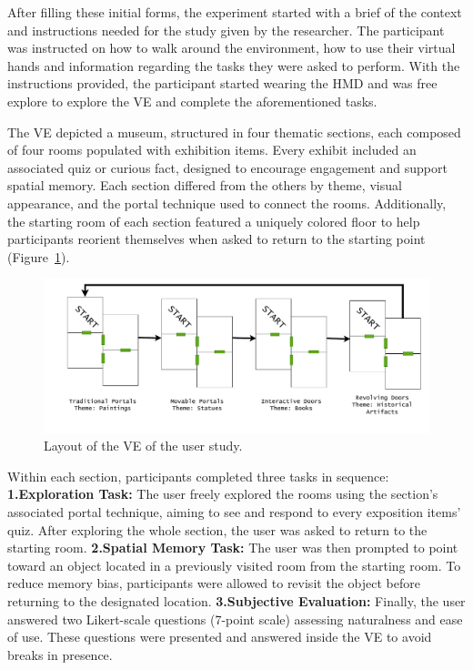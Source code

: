 After filling these initial forms, the experiment started with a brief of the context and instructions needed for the study given by the 
researcher. The participant was instructed on how to walk around the environment, how to use their virtual hands and 
information regarding the tasks they were asked to perform.  With the instructions provided, the participant started wearing the 
\gls{HMD} and was free explore to explore the \gls{VE} and complete the aforementioned tasks.

The \gls{VE} depicted a museum, structured in four thematic sections, each composed of four rooms populated with exhibition items. Every 
exhibit included an associated quiz or curious fact, designed to encourage engagement and support spatial memory. Each section differed 
from the others by theme, visual appearance, and the portal technique used to connect the rooms. Additionally, the starting room of each 
section featured a uniquely colored floor to help participants reorient themselves when asked to return to the starting point 
(Figure~\ref{fig:layout}).

\begin{figure}[t]
\centering
\includegraphics[width=\linewidth]{NOVAthesisFiles/Images/schemes/layout-study.drawio.pdf}
\caption{Layout of the \gls{VE} of the user study.}
\label{fig:layout}
\end{figure}

Within each section, participants completed three tasks in sequence:  
\textbf{1.Exploration Task:} The user freely explored the rooms using the section's associated portal technique, aiming to see and respond 
to every exposition items' quiz. After exploring the whole section, the user was asked to return to the starting room.  
\textbf{2.Spatial Memory Task:} The user was then prompted to point toward an object located in a previously visited room from the starting room. 
To reduce memory bias, participants were allowed to revisit the object before returning to the designated location.  
\textbf{3.Subjective Evaluation:} Finally, the user answered two Likert-scale questions (7-point scale) assessing naturalness and ease 
of use. These questions were presented and answered inside the \gls{VE} to avoid breaks in presence.  

